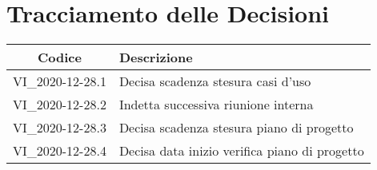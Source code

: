 \section*{Tracciamento delle Decisioni}

\begin{center}
	\begin{longtable}{|c|p{14.5cm}|}
		\hline
		\rowcolor{lighter-grayer}
		\textbf{Codice} & \textbf{Descrizione}                     \\
		\hline
		\endfirsthead

		\hline
		VI\_2020-12-28.1          & Decisa scadenza stesura casi d'uso \\
		VI\_2020-12-28.2          & Indetta successiva riunione interna \\
		VI\_2020-12-28.3          & Decisa scadenza stesura piano di progetto \\
		VI\_2020-12-28.4          & Decisa data inizio verifica piano di progetto \\
		\hline
	\end{longtable}
\end{center}